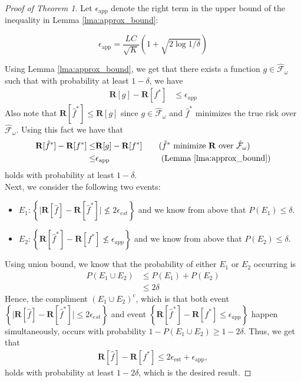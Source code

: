 \documentclass{article}
\begin{document}
\begin{proof}[Proof of Theorem 1]
     Let $\epsilon_{\text{app}}$ denote the right term in the upper bound of the inequality in Lemma \ref{lma:approx_bound}:

     \begin{equation*}
         \epsilon_{\text{app}} = \frac{LC}{\sqrt{K}} \left(1+\sqrt{2 \log 1/\delta} \right)
     \end{equation*}

     Using Lemma \ref{lma:approx_bound}, we get that there exists a function $g \in \hat{\mathcal{F}}_\omega$ such that with probability at least $1-\delta$, we have
     \begin{align*}
         \bm R[g] - \bm R[f^*] &\leq \epsilon_{app}
     \end{align*}
     Also note that $\mathbf{R}[\hat{f}^*]\leq\mathbf{R}[g]$ since $g \in \hat{\mathcal{F}}_\omega$ and $\hat{f}^*$ minimizes the true risk over $\hat{\mathcal{F}}_\omega$. Using this fact we have that
     \begin{align*}
         \mathbf{R}[\hat{f}^*]-\mathbf{R}[f^*]
         \leq& \mathbf{R}[g]-\mathbf{R}[f^*] \quad\quad \text{($\hat{f}^*$ minimize $\mathbf{R}$ over $\hat{\mathcal{F}}_\omega$)}\\
         \leq& \epsilon_{\text{app}} \quad\hspace{52.5pt}\text{(Lemma \ref{lma:approx_bound})}
     \end{align*}
     holds with probability at least $1-\delta$. \\

     Next, we consider the following two events:
     \begin{itemize}
         \item $E_1: \left\{\Big| \mathbf{R}[\hat{f}]-\mathbf{R}[\hat{f}^*]\Big| \nleq 2\epsilon_{est}\right\}$ and we know from above that $P(E_1) \leq \delta$.
         \item $E_2: \left\{\mathbf{R}[\hat{f}^*]-\mathbf{R}[f^*] \nleq \epsilon_{app}\right\}$ and we know from above that $P(E_2) \leq \delta$.
     \end{itemize}
     Using union bound, we know that the probability of either
      $E_1$ or $E_2$ occurring is
      \begin{align*}
          P(E_1 \cup E_2) &\leq P(E_1) + P(E_2) \\
          &\leq 2\delta
      \end{align*}
     Hence, the compliment $(E_1 \cup E_2)^c$, which is that both event $\left\{\Big| \mathbf{R}[\hat{f}]-\mathbf{R}[\hat{f}^*]\Big| \leq 2\epsilon_{est}\right\}$ and event $\left\{\mathbf{R}[\hat{f}^*]-\mathbf{R}[f^*] \leq \epsilon_{app}\right\}$ happen simultaneously, occurs with probability $1 - P(E_1 \cup E_2) \geq 1 - 2\delta$. Thus, we get that
     \begin{align*}
        \mathbf{R}[\hat{f}]-\mathbf{R}[f^*]
        \leq 2\epsilon_{\text{est}} + \epsilon_{\text{app}},
    \end{align*}
    holds with probability at least $1-2\delta$, which is the desired result.
\end{proof}


    \nocite{*}
    
    
\end{document}

